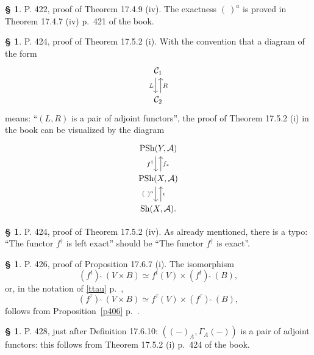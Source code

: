 \documentclass[12pt]{article}%
\theoremstyle{remark}
\theoremstyle{definition}
\newtheorem{s}[thm]{\S}%
\newcommand{\oo}{\operatorname}
\newcommand{\A}{\mathcal A}
\newcommand{\C}{\mathcal C}
\begin{document}

\begin{s} 
P. 422, proof of Theorem 17.4.9 (iv). The exactness $(\ )^a$ is proved in Theorem 17.4.7 (iv) p.~421 of the book.
\end{s}

%

\begin{s} 
P. 424, proof of Theorem 17.5.2 (i). With the convention that a diagram of the form 
$$
\begin{tikzcd} 
\C_1\ar[xshift=-0.7ex]{d}[swap]{L}\\ \C_2\ar[xshift=0.7ex]{u}[swap]{R}
\end{tikzcd}
$$ 
means: ``$(L,R)$ is a pair of adjoint functors'', the proof of Theorem 17.5.2 (i) in the book can be visualized by the diagram 
$$
\begin{tikzcd} 
\oo{PSh}(Y,\A)\ar[xshift=-0.7ex]{d}[swap]{f^\dagger}\\ 
\oo{PSh}(X,\A)\ar[xshift=0.7ex]{u}[swap]{f_*}\ar[xshift=-0.7ex]{d}[swap]{(\ )^a}\\ 
\oo{Sh}(X,\A).\ar[xshift=0.7ex]{u}[swap]{\iota}
\end{tikzcd}
$$ 
\end{s}

%

\begin{s} 
P. 424, proof of Theorem 17.5.2 (iv). As already mentioned, there is a typo: ``The functor $f^\dagger$ is left exact'' should be ``The functor $f^\dagger$ is exact''. %
\end{s}

\begin{s} 
P. 426, proof of Proposition 17.6.7 (i). The isomorphism 
$$
(f^t)\ \widehat{}\ (V\times B)\simeq f^t(V)\times(f^t)\ \widehat{}\ (B),
$$ 
or, in the notation of \eqref{ttau} p.~\pageref{ttau}, 
$$
(f^\tau)\ \widehat{}\ (V\times B)\simeq f^\tau(V)\times(f^\tau)\ \widehat{}\ (B),
$$
follows from Proposition~\ref{p406} p.~\pageref{p406}.
\end{s}

%

\begin{s}\label{a428}
P. 428, just after Definition 17.6.10: $((-)_A,\Gamma_A(-))$ is a pair of adjoint functors: this follows from Theorem 17.5.2 (i) p.~424 of the book.
\end{s}
\end{document}
